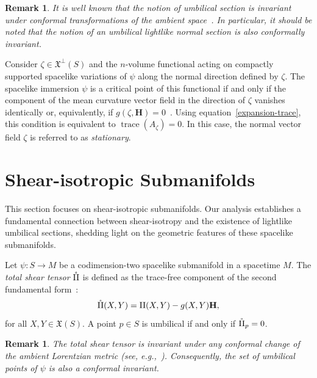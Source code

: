 \documentclass[11pt]{article}
\numberwithin{equation}{section}
\newtheorem{remark}[theorem]{Remark}
\begin{document}
	\begin{remark} \label{CIS} \rm
		It is well known that the notion of umbilical section is invariant under conformal transformations of the ambient space~\cite{chen74}. In particular, it should be noted that the notion of an umbilical lightlike normal section is also conformally invariant.
	\end{remark}
	
	Consider $\zeta \in {\mathfrak X}^\perp(S)$ and the $n$-volume functional acting on compactly supported spacelike variations of $\psi$ along the normal direction defined by $\zeta$. The spacelike immersion $\psi$ is a critical point of this functional if and only if the component of the mean curvature vector field in the direction of $\zeta$ vanishes identically or, equivalently, if $g(\zeta, \mathbf{H}) = 0$~\cite[p.~299]{oneill}. Using equation~\eqref{expansion-trace}, this condition is equivalent to $\operatorname{trace}(A_\zeta) = 0$. In this case, the normal vector field $\zeta$ is referred to as \emph{stationary}.
	
	
	
	
	
	
	\section{Shear-isotropic Submanifolds}\label{sec:shear_iso}
	
	This section focuses on shear-isotropic submanifolds. Our analysis establishes a fundamental connection between shear-isotropy and the existence of lightlike umbilical sections, shedding light on the geometric features of these spacelike submanifolds.
	
	Let $\psi\colon S \to M$ be a codimension-two spacelike submanifold in a spacetime $M$. The \emph{total shear tensor} $\mathring{{\rm II}}$ is defined as the trace-free component of the second fundamental form~\cite{cipriani}:
	\begin{equation}\label{shear1}
		\mathring{{\rm II}}(X,Y) = {\rm II}(X,Y) - g(X,Y)\mathbf{H},
	\end{equation}
	for all $X, Y \in {\mathfrak X}(S)$. A point $p \in S$ is umbilical if and only if $\mathring{{\rm II}}_p = 0$.
	
	\begin{remark}\normalfont
		The total shear tensor is invariant under any conformal change of the ambient Lorentzian metric (see, e.g.,~\cite{fialkow}). Consequently, the set of umbilical points of $\psi$ is also a conformal invariant.
	\end{remark}
	
\end{document}
